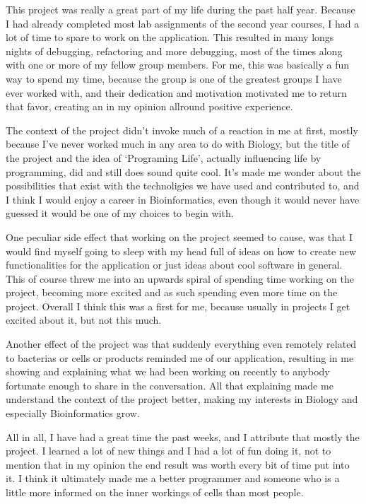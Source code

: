 	This project was really a great part of my life during the past half year. Because I had already completed most lab assignments of the second year courses, I had a lot of time to spare to work on the application. This resulted in many longs nights of debugging, refactoring and more debugging, most of the times along with one or more of my fellow group members. For me, this was basically a fun way to spend my time, because the group is one of the greatest groups I have ever worked with, and their dedication and motivation motivated me to return that favor, creating an in my opinion allround positive experience.

	The context of the project didn't invoke much of a reaction in me at first, mostly because I've never worked much in any area to do with Biology, but the title of the project and the idea of `Programing Life', actually influencing life by programming, did and still does sound quite cool. It's made me wonder about the possibilities that exist with the technoligies we have used and contributed to, and I think I would enjoy a career in Bioinformatics, even though it would never have guessed it would be one of my choices to begin with.

	One peculiar side effect that working on the project seemed to cause, was that I would find myself going to sleep with my head full of ideas on how to create new functionalities for the application or just ideas about cool software in general. This of course threw me into an upwards spiral of spending time working on the project, becoming more excited and as such spending even more time on the project. Overall I think this was a first for me, because usually in projects I get excited about it, but not this much.

	Another effect of the project was that suddenly everything even remotely related to bacterias or cells or products reminded me of our application, resulting in me showing and explaining what we had been working on recently to anybody fortunate enough to share in the conversation. All that explaining made me understand the context of the project better, making my interests in Biology and especially Bioinformatics grow.

	All in all, I have had a great time the past weeks, and I attribute that mostly the project. I learned a lot of new things and I had a lot of fun doing it, not to mention that in my opinion the end result was worth every bit of time put into it. I think it ultimately made me a better programmer and someone who is a little more informed on the inner workings of cells than most people.
